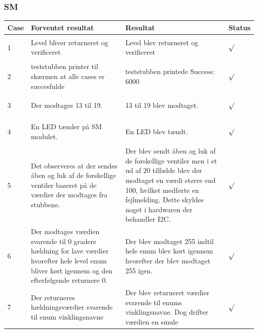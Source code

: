 \subsubsection{SM}
\begin{table}[H]
\centering
\begin{tabular}{| p{1cm}  | p{4cm} | p{6cm} | p{1cm} |}
\hline
Case &Forventet resultat &Resultat &Status\\\hline
1 &Level bliver returneret og verificeret &Level blev returneret og verificeret &\begin{Huge}$\surd$\end{Huge} \\\hline 
2 &teststubben printer til skærmen at alle cases er succesfulde &teststubben printede Success: 6000 &\begin{Huge}$\surd$\end{Huge} \\\hline
3 &Der modtages 13 til 19. &13 til 19 blev modtaget. &\begin{Huge}$\surd$\end{Huge} \\\hline
4 &En LED tænder på SM modulet. &En LED blev tændt. &\begin{Huge}$\surd$\end{Huge} \\\hline
5 &Det observeres at der sendes åben og luk af de forskellige ventiler baseret på de værdier der modtages fra stubbene. &Der blev sendt åben og luk af de forskellige ventiler men i et ud af 20 tilfælde blev der modtaget en værdi større end 100, hvilket medførte en fejlmelding. Dette skyldes noget i hardwaren der behandler I2C. &\begin{Huge}$\surd$\end{Huge} \\\hline
6 &Der modtages værdien svarende til 0 graders hældning for lave værdier hvorefter hele level enum bliver kørt igennem og den efterfølgende returnere 0. &Der blev modtaget 255 indtil hele enum blev kørt igennem hvorefter der blev modtaget 255 igen. &\begin{Huge}$\surd$\end{Huge} \\\hline
7 &Der returneres hældningsværdier svarende til enum vinklingsnavne &Der blev returneret værdier svarende til enums vinklingsnavne. Dog drifter værdien en smule&\begin{Huge}$\surd$\end{Huge} \\\hline
\end{tabular}
\end{table}
